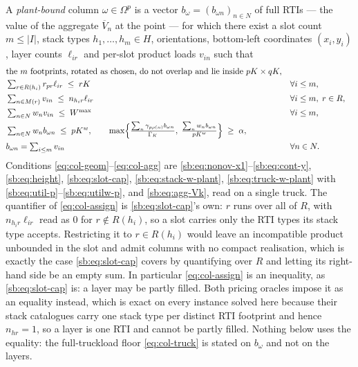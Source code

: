 A \emph{plant-bound} column $\omega\in\Omega^{p}$ is a vector
$b_{\omega}=(b_{\omega n})_{n\in N}$ of full RTIs --- the value of the
aggregate $\overline{V}_{n}$ at the point --- for which there exist a
slot count $m\le|I|$, stack types $h_{1},\dots,h_{m}\in H$,
orientations, bottom-left coordinates $(x_{i},y_{i})$, layer counts
$\ell_{ir}$ and per-slot product loads $v_{in}$ such that
\begin{align}
&\text{the $m$ footprints, rotated as chosen, do not overlap and lie
   inside } pK\times qK,
   \label{eq:col-geom}\\
&\textstyle\sum_{r\in R(h_{i})} r_{pr}\ell_{ir}\;\le\;rK
   &&\forall i\le m,
   \label{eq:col-height}\\
&\textstyle\sum_{n\in M(r)} v_{in}\;\le\;n_{h_{i}r}\ell_{ir}
   &&\forall i\le m,\;r\in R,
   \label{eq:col-assign}\\
&\textstyle\sum_{n\in N} w_{n}v_{in}\;\le\;W^{\max}
   &&\forall i\le m,
   \label{eq:col-crush}\\
&\textstyle\sum_{n\in N} w_{n}b_{\omega n}\;\le\;pK^{w},
   \qquad
   \max\Bigl\{\tfrac{\sum_{n}\gamma_{p\rho(n)}b_{\omega n}}{\Gamma_{K}},\;
              \tfrac{\sum_{n}w_{n}b_{\omega n}}{pK^{w}}\Bigr\}\;\ge\;\alpha,
   \label{eq:col-truck}\\
&b_{\omega n}=\textstyle\sum_{i\le m} v_{in}
   &&\forall n\in N.
   \label{eq:col-agg}
\end{align}
Conditions \eqref{eq:col-geom}--\eqref{eq:col-agg} are
\eqref{sb:eq:nonov-x1}--\eqref{sb:eq:cont-y}, \eqref{sb:eq:height},
\eqref{sb:eq:slot-cap}, \eqref{sb:eq:stack-w-plant},
\eqref{sb:eq:truck-w-plant} with \eqref{sb:eq:util-p}--\eqref{sb:eq:utilw-p},
and \eqref{sb:eq:agg-Vk}, read on a single truck. The quantifier of
\eqref{eq:col-assign} is \eqref{sb:eq:slot-cap}'s own: $r$ runs over all
of $R$, with $n_{h_{i}r}\ell_{ir}$ read as $0$ for $r\notin R(h_{i})$,
so a slot carries only the RTI types its stack type accepts. Restricting
it to $r\in R(h_{i})$ would leave an incompatible product unbounded in
the slot and admit columns with no compact realisation, which is exactly
the case \eqref{sb:eq:slot-cap} covers by quantifying over $R$ and
letting its right-hand side be an empty sum. In particular
\eqref{eq:col-assign} is an inequality, as \eqref{sb:eq:slot-cap} is: a
layer may be partly filled. Both pricing oracles impose it as an
equality instead, which is exact on every instance solved here because
their stack catalogues carry one stack type per distinct RTI footprint
and hence $n_{hr}=1$, so a layer is one RTI and cannot be partly
filled. Nothing below uses the equality: the full-truckload floor
\eqref{eq:col-truck} is stated on $b_{\omega}$ and not on the layers.

